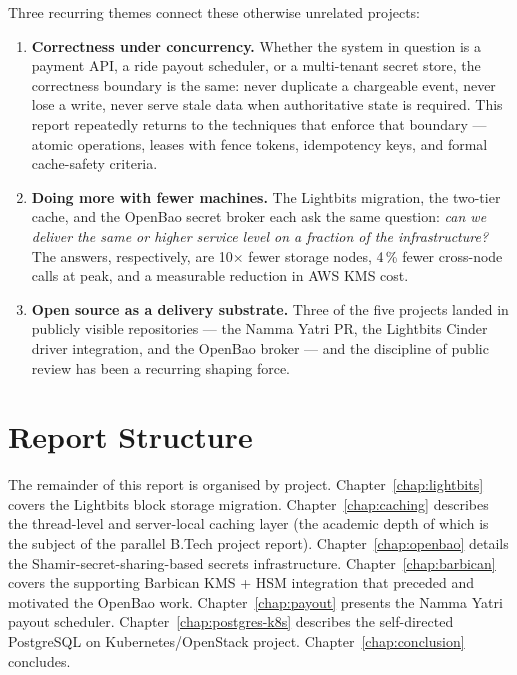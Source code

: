 \documentclass[12pt,a4paper,oneside]{report}
\begin{document}
Three recurring themes connect these otherwise unrelated projects:

\begin{enumerate}[leftmargin=*]
    \item \textbf{Correctness under concurrency.} Whether the system in question is a payment API, a ride payout scheduler, or a multi-tenant secret store, the correctness boundary is the same: never duplicate a chargeable event, never lose a write, never serve stale data when authoritative state is required. This report repeatedly returns to the techniques that enforce that boundary --- atomic operations, leases with fence tokens, idempotency keys, and formal cache-safety criteria.
    \item \textbf{Doing more with fewer machines.} The Lightbits migration, the two-tier cache, and the OpenBao secret broker each ask the same question: \emph{can we deliver the same or higher service level on a fraction of the infrastructure?} The answers, respectively, are 10$\times$ fewer storage nodes, 4\,\% fewer cross-node calls at peak, and a measurable reduction in AWS KMS cost.
    \item \textbf{Open source as a delivery substrate.} Three of the five projects landed in publicly visible repositories --- the Namma Yatri PR, the Lightbits Cinder driver integration, and the OpenBao broker --- and the discipline of public review has been a recurring shaping force.
\end{enumerate}

\section{Report Structure}

The remainder of this report is organised by project. Chapter~\ref{chap:lightbits} covers the Lightbits block storage migration. Chapter~\ref{chap:caching} describes the thread-level and server-local caching layer (the academic depth of which is the subject of the parallel B.Tech project report). Chapter~\ref{chap:openbao} details the Shamir-secret-sharing-based secrets infrastructure. Chapter~\ref{chap:barbican} covers the supporting Barbican KMS + HSM integration that preceded and motivated the OpenBao work. Chapter~\ref{chap:payout} presents the Namma Yatri payout scheduler. Chapter~\ref{chap:postgres-k8s} describes the self-directed PostgreSQL on Kubernetes/OpenStack project. Chapter~\ref{chap:conclusion} concludes.


\end{document}

